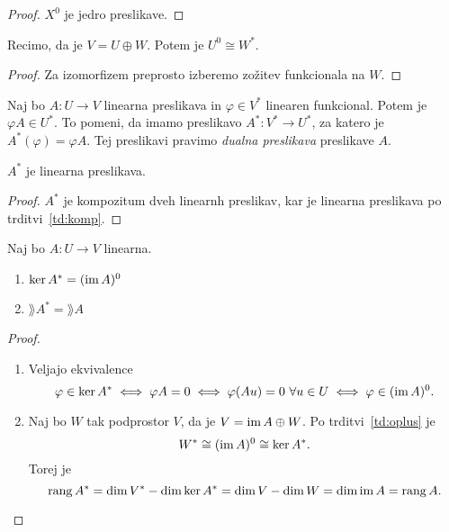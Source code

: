 \documentclass[12pt, a4paper]{article}
\begin{document}
\begin{proof}
$X^0$ je jedro preslikave.
\end{proof}

\begin{trditev}\label{td:oplus}
Recimo, da je $V=U\oplus W$. Potem je $U^0\cong W^*$.
\end{trditev}

\begin{proof}
Za izomorfizem preprosto izberemo zožitev funkcionala na $W$.
\end{proof}

\begin{definicija}
Naj bo $A\colon U\to V$ linearna preslikava in $\varphi\in V^*$ linearen funkcional. Potem je $\varphi A\in U^*$. To pomeni, da imamo preslikavo $A^*\colon V^*\to U^*$, za katero je $A^*(\varphi)=\varphi A$. Tej preslikavi pravimo \emph{dualna preslikava} preslikave $A$.
\end{definicija}

\begin{trditev}
$A^*$ je linearna preslikava.
\end{trditev}

\begin{proof}
$A^*$ je kompozitum dveh linearnh preslikav, kar je linearna preslikava po trditvi~\ref{td:komp}.
\end{proof}

\begin{izrek}\label{iz:rang}
Naj bo $A\colon U\to V$ linearna.
\begin{enumerate}[label=\alph*)]
\item $\ker A^*=(\operatorname{im} A)^0$
\item $\rang A^*=\rang A$
\end{enumerate}
\end{izrek}

\begin{proof}
\begin{enumerate}[label=\alph*)]
\item Veljajo ekvivalence
\[
\varphi\in\ker A^*\iff \varphi A=0\iff \varphi(Au)=0~\forall u\in U\iff \varphi\in(\operatorname{im} A)^0.
\]
\item Naj bo $W$ tak podprostor $V$, da je $V=\operatorname{im} A\oplus W$. Po trditvi~\ref{td:oplus} je
\[
W^*\cong (\operatorname{im} A)^0\cong\ker A^*.
\]
Torej je
\[
\operatorname{rang} A^*=\dim V^*-\dim\ker A^*=\dim V-\dim W=\dim\operatorname{im} A=\operatorname{rang} A.\qedhere
\]
\end{enumerate}
\end{proof}
\end{document}
